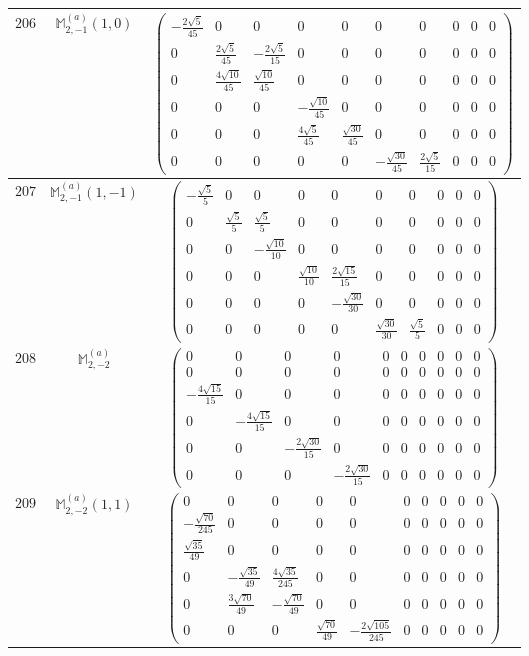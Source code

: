 \documentclass[fleqn,8pt,landscape]{jsarticle}
\begin{document}
\begin{center}
\begin{longtable}{ccc}
$ 206 $ & $ \mathbb{M}_{2,-1}^{(a)}(1,0) $ & $ \begin{pmatrix} - \frac{2 \sqrt{5}}{45} & 0 & 0 & 0 & 0 & 0 & 0 & 0 & 0 & 0 \\ 0 & \frac{2 \sqrt{5}}{45} & - \frac{2 \sqrt{5}}{15} & 0 & 0 & 0 & 0 & 0 & 0 & 0 \\ 0 & \frac{4 \sqrt{10}}{45} & \frac{\sqrt{10}}{45} & 0 & 0 & 0 & 0 & 0 & 0 & 0 \\ 0 & 0 & 0 & - \frac{\sqrt{10}}{45} & 0 & 0 & 0 & 0 & 0 & 0 \\ 0 & 0 & 0 & \frac{4 \sqrt{5}}{45} & \frac{\sqrt{30}}{45} & 0 & 0 & 0 & 0 & 0 \\ 0 & 0 & 0 & 0 & 0 & - \frac{\sqrt{30}}{45} & \frac{2 \sqrt{5}}{15} & 0 & 0 & 0 \end{pmatrix} $ \\ \hline
$ 207 $ & $ \mathbb{M}_{2,-1}^{(a)}(1,-1) $ & $ \begin{pmatrix} - \frac{\sqrt{5}}{5} & 0 & 0 & 0 & 0 & 0 & 0 & 0 & 0 & 0 \\ 0 & \frac{\sqrt{5}}{5} & \frac{\sqrt{5}}{5} & 0 & 0 & 0 & 0 & 0 & 0 & 0 \\ 0 & 0 & - \frac{\sqrt{10}}{10} & 0 & 0 & 0 & 0 & 0 & 0 & 0 \\ 0 & 0 & 0 & \frac{\sqrt{10}}{10} & \frac{2 \sqrt{15}}{15} & 0 & 0 & 0 & 0 & 0 \\ 0 & 0 & 0 & 0 & - \frac{\sqrt{30}}{30} & 0 & 0 & 0 & 0 & 0 \\ 0 & 0 & 0 & 0 & 0 & \frac{\sqrt{30}}{30} & \frac{\sqrt{5}}{5} & 0 & 0 & 0 \end{pmatrix} $ \\ \hline
$ 208 $ & $ \mathbb{M}_{2,-2}^{(a)} $ & $ \begin{pmatrix} 0 & 0 & 0 & 0 & 0 & 0 & 0 & 0 & 0 & 0 \\ 0 & 0 & 0 & 0 & 0 & 0 & 0 & 0 & 0 & 0 \\ - \frac{4 \sqrt{15}}{15} & 0 & 0 & 0 & 0 & 0 & 0 & 0 & 0 & 0 \\ 0 & - \frac{4 \sqrt{15}}{15} & 0 & 0 & 0 & 0 & 0 & 0 & 0 & 0 \\ 0 & 0 & - \frac{2 \sqrt{30}}{15} & 0 & 0 & 0 & 0 & 0 & 0 & 0 \\ 0 & 0 & 0 & - \frac{2 \sqrt{30}}{15} & 0 & 0 & 0 & 0 & 0 & 0 \end{pmatrix} $ \\ \hline
$ 209 $ & $ \mathbb{M}_{2,-2}^{(a)}(1,1) $ & $ \begin{pmatrix} 0 & 0 & 0 & 0 & 0 & 0 & 0 & 0 & 0 & 0 \\ - \frac{\sqrt{70}}{245} & 0 & 0 & 0 & 0 & 0 & 0 & 0 & 0 & 0 \\ \frac{\sqrt{35}}{49} & 0 & 0 & 0 & 0 & 0 & 0 & 0 & 0 & 0 \\ 0 & - \frac{\sqrt{35}}{49} & \frac{4 \sqrt{35}}{245} & 0 & 0 & 0 & 0 & 0 & 0 & 0 \\ 0 & \frac{3 \sqrt{70}}{49} & - \frac{\sqrt{70}}{49} & 0 & 0 & 0 & 0 & 0 & 0 & 0 \\ 0 & 0 & 0 & \frac{\sqrt{70}}{49} & - \frac{2 \sqrt{105}}{245} & 0 & 0 & 0 & 0 & 0 \end{pmatrix} $ \\ \hline

\end{longtable}
\end{center}
\end{document}
